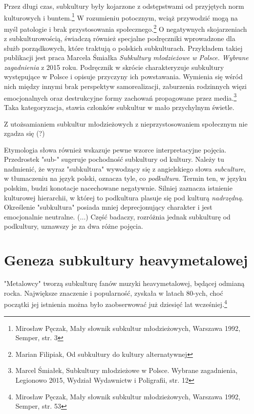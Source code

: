 \documentclass[12pt, a4paper, titlepage]{report}
\begin{document}
Przez długi czas, subkultury były kojarzone z odstępstwami od przyjętych norm kulturowych i buntem.\footnote{Mirosław Pęczak, Mały słownik subkultur młodzieżowych, Warszawa 1992, Semper, str. 3} W rozumieniu potocznym, wciąż przywodzić mogą na myśl patologie i brak przystosowania społecznego.\footnote{Marian Filipiak, Od subkultury do kultury alternatywnej} O negatywnych skojarzeniach z subkulturowością, świadczą również specjalne podręczniki wprowadzone dla służb porządkowych, które traktują o polskich subkulturach. Przykładem takiej publikacji jest praca Marcela Śmiałka \textit{Subkultury młodzieżowe w Polsce. Wybrane zagadnienia} z 2015 roku. Podręcznik w skrócie charakteryzuje subkultury występujące w Polsce i opisuje przyczyny ich powstawania. Wymienia się wśród nich między innymi brak perspektyw samorealizacji, zaburzenia rodzinnych więzi emocjonalnych oraz destrukcyjne formy zachowań propagowane przez media.\footnote{Marcel Śmiałek, Subkultury młodzieżowe w Polsce. Wybrane zagadnienia, Legionowo 2015, Wydział Wydawnictw i Poligrafii, str. 12} Taka kategoryzacja, stawia członków subkultur w mało przychylnym świetle. 

Z utożsamianiem subkultur młodzieżowych z nieprzystosowaniem społecznym nie zgadza się (?)

Etymologia słowa również wskazuje pewne wzorce interpretacyjne pojęcia. Przedrostek "sub-" sugeruje pochodność subkultury od kultury.   Należy tu nadmienić, że wyraz "subkultura" wywodzący się z angielskiego słowa \textit{subculture}, w tłumaczeniu na język polski, oznacza tyle, co \textit{podkultura}. Termin ten, w języku polskim, budzi konotacje nacechowane negatywnie. Silniej zaznacza istnienie kulturowej hierarchii, w której to podkultura plasuje się pod kulturą \textit{nadrzędną}. Określenie "subkultura" posiada mniej deprecjonujący charakter i jest emocjonalnie neutralne. (...) Część badaczy, rozróżnia jednak subkulturę od podkultury, uznawszy je za dwa różne pojęcia. %


\newpage
\section{Geneza subkultury heavymetalowej}
"Metalowcy" tworzą subkulturę fanów muzyki heavymetalowej, będącej odmianą rocka. Największe znaczenie i popularność, zyskała w latach 80-ych, choć początki jej istnienia można było zaobserwować już dziesięć lat wcześniej.\footnote{Mirosław Pęczak, Mały słownik subkultur młodzieżowych, Warszawa 1992, Semper, str. 53}
\end{document}
